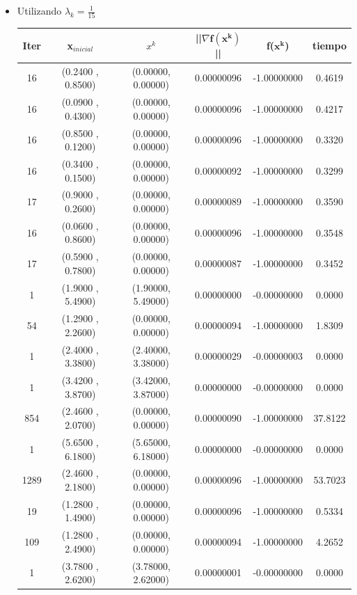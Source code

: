 \begin{itemize}
\item  Utilizando $\lambda_k = \frac{1}{15}$

\begin{table}[H]
\centering
\renewcommand{\arraystretch}{1.2} 
\begin{tabular}{|c|c|c|c|c|c|}
\hline
\textbf{Iter} & \textbf{x$_{inicial}$} & \textbf{$x^k$} & \textbf{||$\nabla \mathbf{f(x^k)}$}|| & \textbf{f($\mathbf{x^k}$)} & \textbf{tiempo} \\
\hline
16   & (0.2400 , 0.8500) & (0.00000, 0.00000) & 0.00000096 & -1.00000000 & 0.4619 \\
16   & (0.0900 , 0.4300) & (0.00000, 0.00000) & 0.00000096 & -1.00000000 & 0.4217 \\
16   & (0.8500 , 0.1200) & (0.00000, 0.00000) & 0.00000096 & -1.00000000 & 0.3320 \\
16   & (0.3400 , 0.1500) & (0.00000, 0.00000) & 0.00000092 & -1.00000000 & 0.3299 \\
17   & (0.9000 , 0.2600) & (0.00000, 0.00000) & 0.00000089 & -1.00000000 & 0.3590 \\
16   & (0.0600 , 0.8600) & (0.00000, 0.00000) & 0.00000096 & -1.00000000 & 0.3548 \\
17   & (0.5900 , 0.7800) & (0.00000, 0.00000) & 0.00000087 & -1.00000000 & 0.3452 \\
1   & (1.9000 , 5.4900) & (1.90000, 5.49000) & 0.00000000 & -0.00000000 & 0.0000 \\
54   & (1.2900 , 2.2600) & (0.00000, 0.00000) & 0.00000094 & -1.00000000 & 1.8309 \\
1   & (2.4000 , 3.3800) & (2.40000, 3.38000) & 0.00000029 & -0.00000003 & 0.0000 \\
1   & (3.4200 , 3.8700) & (3.42000, 3.87000) & 0.00000000 & -0.00000000 & 0.0000 \\
854   & (2.4600 , 2.0700) & (0.00000, 0.00000) & 0.00000090 & -1.00000000 & 37.8122 \\
1   & (5.6500 , 6.1800) & (5.65000, 6.18000) & 0.00000000 & -0.00000000 & 0.0000 \\
1289   & (2.4600 , 2.1800) & (0.00000, 0.00000) & 0.00000096 & -1.00000000 & 53.7023 \\
19   & (1.2800 , 1.4900) & (0.00000, 0.00000) & 0.00000096 & -1.00000000 & 0.5334 \\
109   & (1.2800 , 2.4900) & (0.00000, 0.00000) & 0.00000094 & -1.00000000 & 4.2652 \\
1   & (3.7800 , 2.6200) & (3.78000, 2.62000) & 0.00000001 & -0.00000000 & 0.0000 \\
\hline
\end{tabular}
\end{table}


\end{itemize}
